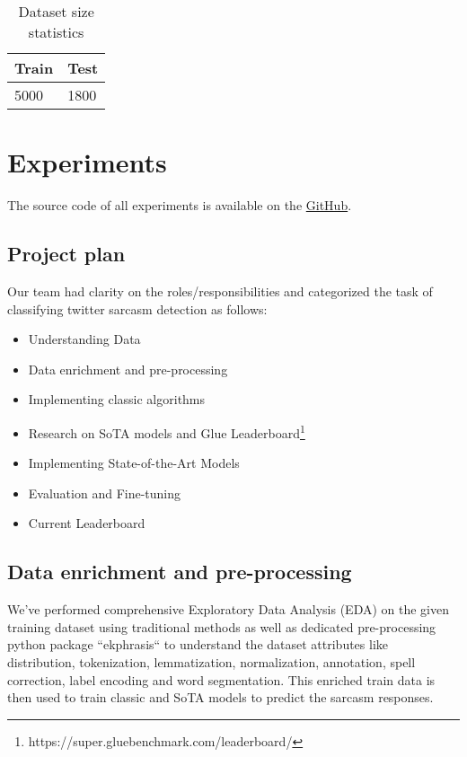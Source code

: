 \documentclass[conference]{IEEEtran}
\begin{document}
\begin{table}[htbp]
\caption{Dataset size statistics}
\begin{center}
\begin{tabular}{|l|l|}
\hline
\textbf{Train} & \textbf{Test} \\ \hline
5000 & 1800          \\ \hline
\end{tabular}
\label{tab1}
\end{center}
\end{table}

\section{Experiments}
The source code of all experiments is available on the \href{https://github.com/dheerajpatta/CourseProject}{GitHub}.

\subsection{Project plan}

Our team had clarity on the roles/responsibilities and categorized the task of classifying twitter sarcasm detection as follows:

\begin{itemize}
	\item Understanding Data
	\item Data enrichment and pre-processing
	\item Implementing classic algorithms
	\item Research on SoTA models and Glue Leaderboard\footnote{https://super.gluebenchmark.com/leaderboard/}
	\item Implementing State-of-the-Art Models
	\item Evaluation and Fine-tuning
	\item Current Leaderboard
\end{itemize}

\subsection{Data enrichment and pre-processing}
We’ve performed comprehensive Exploratory Data Analysis (EDA) on the given training dataset using traditional methods as well as dedicated pre-processing python package ``ekphrasis`` to understand the dataset attributes like distribution, tokenization, lemmatization, normalization, annotation, spell correction, label encoding and word segmentation. This enriched train data is then used to train classic and SoTA models to predict the sarcasm responses. 
\end{document}
